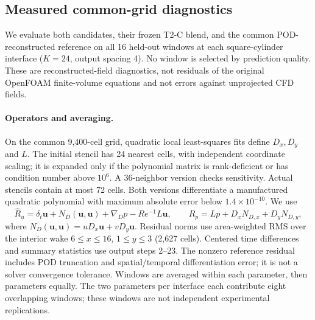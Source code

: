 \subsection{Measured common-grid diagnostics}
\label{app:fusion_measured}
We evaluate both candidates, their frozen T2-C blend, and the common
POD-reconstructed reference on all 16 held-out windows at each square-cylinder
interface ($K=24$, output spacing 4). No window is selected by prediction
quality. These are reconstructed-field diagnostics, not residuals of the
original OpenFOAM finite-volume equations and not errors against unprojected
CFD fields.

\paragraph{Operators and averaging.}
On the common 9,400-cell grid, quadratic local least-squares fits define
$D_x,D_y$ and $L$. The initial stencil has 24 nearest cells, with independent
coordinate scaling; it is expanded only if the polynomial matrix is
rank-deficient or has condition number above $10^6$. A 36-neighbor version
checks sensitivity. Actual stencils contain at most 72 cells. Both versions
differentiate a manufactured quadratic polynomial with maximum absolute
error below $1.4\times10^{-10}$. We use
\begin{equation}
\widehat R_u=\delta_t\bm u+N_D(\bm u,\bm u)+\nabla_Dp-Re^{-1}L\bm u,
\qquad
\widehat R_p=Lp+D_xN_{D,x}+D_yN_{D,y},
\end{equation}
where $N_D(\bm u,\bm u)=uD_x\bm u+vD_y\bm u$.
Residual norms use area-weighted RMS over the interior wake
$6\leq x\leq16$, $1\leq y\leq3$ (2,627 cells).
Centered time differences and summary statistics use output steps 2--23.
The nonzero reference residual includes POD truncation and spatial/temporal
differentiation error; it is not a solver convergence tolerance. Windows
are averaged within each parameter, then parameters equally. The two
parameters per interface each contribute eight overlapping windows;
these windows are not independent experimental replications.

